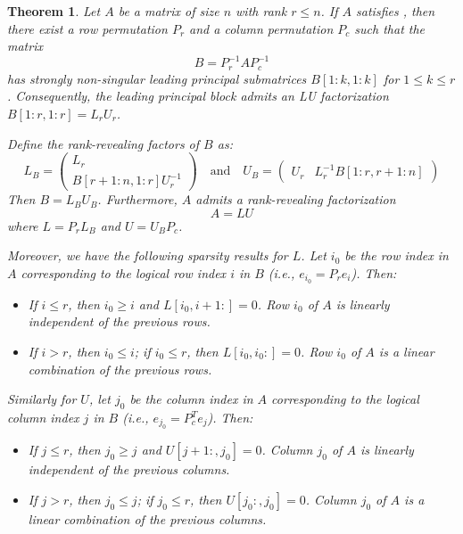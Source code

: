 \documentclass{article}
\newtheorem{theorem}{Theorem}[section]
\begin{document}
\begin{theorem}\label{thm:main2}
    Let $A$ be a matrix of size $n$ with rank $r \le n$. If $A$ satisfies , then there exist a row permutation $P_r$ and a column permutation $P_c$ such that the matrix
    \[ B = P_r^{-1} A P_c^{-1} \]
    has strongly non-singular leading principal submatrices $B[1:k,1:k]$ for $1 \le k \le r$. Consequently, the leading principal block admits an LU factorization $B[1:r,1:r] = L_r U_r$.

    Define the rank-revealing factors of $B$ as:
    \[
        L_B = \begin{pmatrix} L_r \\ B[r+1:n, 1:r] U_r^{-1} \end{pmatrix}
        \quad \text{and} \quad
        U_B = \begin{pmatrix} U_r & L_r^{-1} B[1:r, r+1:n] \end{pmatrix}
    \]
    Then $B = L_B U_B$. Furthermore, $A$ admits a rank-revealing factorization
    \[ A = L U \]
    where $L = P_r L_B$ and $U = U_B P_c$.

    Moreover, we have the following sparsity results for $L$. Let $i_0$ be the row index in $A$ corresponding to the logical row index $i$ in $B$ (i.e., $e_{i_0} = P_r e_i$). Then:
    \begin{itemize}
        \item If $i \le r$, then $i_0 \ge i$ and $L[i_0, i+1:] = 0$. Row $i_0$ of $A$ is linearly independent of the previous rows.
        \item If $i > r$, then $i_0 \le i$; if $i_0 \le r$, then $L[i_0,i_0:] = 0$. Row $i_0$ of $A$ is a linear combination of the previous rows.
    \end{itemize}
    Similarly for $U$, let $j_0$ be the column index in $A$ corresponding to the logical column index $j$ in $B$ (i.e., $e_{j_0} = P_c^T e_j$). Then:
    \begin{itemize}
        \item If $j \le r$, then $j_0 \ge j$ and $U[j+1:, j_0] = 0$. Column $j_0$ of $A$ is linearly independent of the previous columns.
        \item If $j > r$, then $j_0 \le j$; if $j_0 \le r$, then $U[j_0:, j_0] = 0$. Column $j_0$ of $A$ is a linear combination of the previous columns.
    \end{itemize}
\end{theorem}
\end{document}
